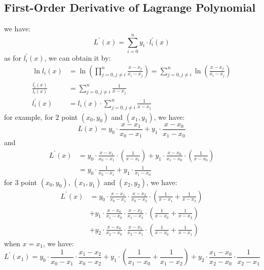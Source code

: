 \documentclass[12pt, onecolumn]{article}
\begin{document}
	\subsection{First-Order Derivative of Lagrange Polynomial}
	we have:
	\begin{equation}
	L^\prime (x)=\sum_{i=0}^{n}y_i\cdot l_i^\prime(x)
	\end{equation}
	as for $l_i^\prime(x)$, we can obtain it by:
	\begin{equation}
	\begin{aligned}
	\ln l_i(x)&=\ln\left( \prod_{j=0,j\ne i}^{n}\frac{x-x_j}{x_i-x_j}\right) =\sum_{j=0,j\ne i}^{n}\ln\left( \frac{x-x_j}{x_i-x_j}\right) 
	\\
	\frac{l_i^\prime(x)}{l_i(x)}&=\sum_{j=0,j\ne i}^{n}\frac{1}{x-x_j}
	\\
	l_i^\prime(x)&=l_i(x)\cdot \sum_{j=0,j\ne i}^{n}\frac{1}{x-x_j}
	\end{aligned}
	\end{equation}
	for example, for $2$ point $(x_0,y_0)$ and $(x_1,y_1)$, we have:
	\begin{equation}
	L(x)=y_0\cdot\frac{x-x_1}{x_0-x_1}+y_1\cdot\frac{x-x_0}{x_1-x_0}
	\end{equation}
	and 
	\begin{equation}
	\begin{aligned}
	L^\prime(x)&=y_0\cdot\frac{x-x_1}{x_0-x_1}\cdot\left(
		\frac{1}{x-x_1}
		\right) +y_1\cdot\frac{x-x_0}{x_1-x_0}\cdot\left(
			\frac{1}{x-x_0}
			\right)
			\\
			&=y_0\cdot\frac{1}{x_0-x_1}+y_1\cdot\frac{1}{x_1-x_0}
	\end{aligned}
	\end{equation}
	for $3$ point $(x_0,y_0)$, $(x_1,y_1)$ and $(x_2,y_2)$, we have:
	\begin{equation}
	\begin{aligned}
	L^\prime(x)&=y_0\cdot\frac{x-x_1}{x_0-x_1}\cdot\frac{x-x_2}{x_0-x_2}\cdot\left(\frac{1}{x-x_1}+\frac{1}{x-x_2}\right) \\
		&+y_1\cdot\frac{x-x_0}{x_1-x_0}\cdot\frac{x-x_2}{x_1-x_2}\cdot\left(\frac{1}{x-x_0}+\frac{1}{x-x_2}\right) \\
		&+y_2\cdot\frac{x-x_0}{x_2-x_0}\cdot\frac{x-x_1}{x_2-x_1}\cdot\left(\frac{1}{x-x_0}+\frac{1}{x-x_1}\right)
	\end{aligned}
	\end{equation}
	when $x=x_1$, we have:
	\begin{equation}
	L^\prime(x_1)=y_0\cdot\frac{1}{x_0-x_1}\cdot\frac{x_1-x_2}{x_0-x_2}
	+y_1\cdot\left(\frac{1}{x_1-x_0}+\frac{1}{x_1-x_2}\right)
	+y_2\cdot\frac{x_1-x_0}{x_2-x_0}\cdot\frac{1}{x_2-x_1}
	\end{equation}
	
\end{document}
